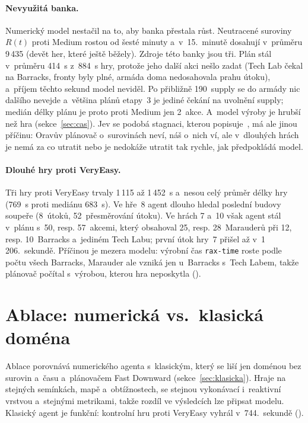 \paragraph{Nevyužitá banka.} Numerický model nestačil na to, aby banka přestala růst. Neutracené suroviny $R(t)$ proti Medium rostou od šesté minuty a~v~15.~minutě dosahují v~průměru 9\,435 (devět her, které ještě běžely). Zdroje této banky jsou tři. Plán stál v~průměru 414~s z~884~s hry, protože jeho další akci nešlo zadat (Tech Lab čekal na Barracks, fronty byly plné, armáda doma nedosahovala prahu útoku), a~příjem těchto sekund model neviděl. Po přibližně 190~supply se do armády nic dalšího nevejde a~většina plánů etapy~3 je jediné čekání na uvolnění supply; medián délky plánu je proto proti Medium jen 2~akce. A~model výroby je hrubší než hra (sekce~\ref{sec:cas}). Jev se podobá stagnaci, kterou popisuje~\cite{Orava2025}, má ale jinou příčinu: Oravův plánovač o~surovinách neví, náš o~nich ví, ale v~dlouhých hrách je nemá za co utratit nebo je nedokáže utratit tak rychle, jak předpokládá model.

\paragraph{Dlouhé hry proti VeryEasy.} Tři hry proti VeryEasy trvaly 1\,115 až 1\,452~s a~nesou celý průměr délky hry (769~s proti mediánu 683~s). Ve hře~8 agent dlouho hledal poslední budovy soupeře (8~útoků, 52~přesměrování útoku). Ve hrách 7 a~10 však agent stál v~plánu s~50, resp. 57~akcemi, který obsahoval 25, resp. 28~Marauderů při 12, resp. 10~Barracks a~jediném Tech Labu; první útok hry~7 přišel až v~1\,206.~sekundě. Příčinou je mezera modelu: výrobní čas \texttt{rax-time} roste podle počtu všech Barracks, Marauder ale vzniká jen u~Barracks s~Tech Labem, takže plánovač počítal s~výrobou, kterou hra neposkytla ().

\section{Ablace: numerická vs.\ klasická doména}
\label{sec:ablace}

Ablace porovnává numerického agenta s~klasickým, který se liší jen doménou bez surovin a~času a~plánovačem Fast Downward (sekce~\ref{sec:klasicka}). Hraje na stejných semínkách, mapě a~obtížnostech, se stejnou vykonávací i~reaktivní vrstvou a~stejnými metrikami, takže rozdíl ve výsledcích lze připsat modelu. Klasický agent je funkční: kontrolní hru proti VeryEasy vyhrál v~744.~sekundě ().

